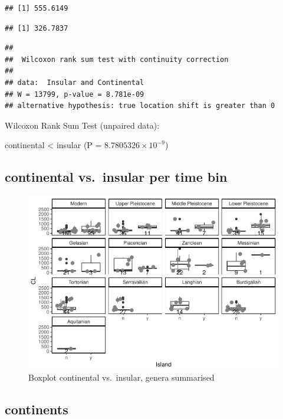 \documentclass[]{article}
\begin{document}
\begin{verbatim}
## [1] 555.6149
\end{verbatim}

\begin{verbatim}
## [1] 326.7837
\end{verbatim}

\begin{verbatim}
## 
##  Wilcoxon rank sum test with continuity correction
## 
## data:  Insular and Continental
## W = 13799, p-value = 8.781e-09
## alternative hypothesis: true location shift is greater than 0
\end{verbatim}

Wilcoxon Rank Sum Test (unpaired data):

continental \textless{} insular (P = \(8.7805326\times 10^{-9}\))

\newpage

\subsection{continental vs.~insular per time
bin}\label{continental-vs.insular-per-time-bin-1}

\begin{figure}[htbp]
\centering
\includegraphics{MA_JJ_files/figure-latex/Boxplot continental vs. insular, split into time bins-1.pdf}
\caption{Boxplot continental vs.~insular, genera summarised}
\end{figure}

\newpage

\subsection{continents}\label{continents-1}
\end{document}
